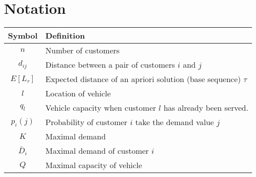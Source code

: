 \chapter*{Notation}
\label{chap:notation}

\begin{table}
 \begin{tabular}{|c|l|}
  \hline
  \textbf{Symbol} & \textbf{Definition}\\
  \hline
  $n$ & Number of customers\\
  $d_{ij}$ & Distance between a pair of customers $i$ and $j$\\
  $E[L_{\tau}]$ & Expected distance of an apriori solution (base sequence) $\tau$\\
  $l$ & Location of vehicle\\
  $q_l$ & Vehicle capacity when customer $l$ has already been served.\\
  $p_i(j)$ & Probability of customer $i$ take the demand value $j$\\
  $K$ & Maximal demand\\
  $\bar{D}_i$ & Maximal demand of customer $i$\\
  $Q$ & Maximal capacity of vehicle\\

  \hline
 \end{tabular}

\end{table}
